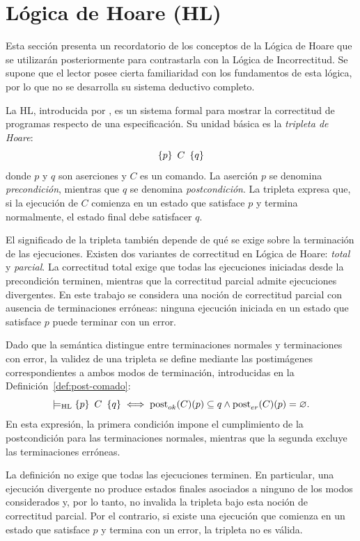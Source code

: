 \documentclass[a4paper,	11pt]{report}
\begin{document}
\section{Lógica de Hoare (HL)}
\label{sec:hoare}
Esta sección presenta un recordatorio de los conceptos de la Lógica de Hoare
que se utilizarán posteriormente para contrastarla con la Lógica de Incorrectitud.
Se supone que el lector posee cierta familiaridad con los fundamentos de esta lógica,
por lo que no se desarrolla su sistema deductivo completo.

La HL, introducida por \citet{hoare}, es un sistema formal para mostrar la correctitud de programas respecto de una especificación.
Su unidad básica es la \emph{tripleta de Hoare}:
$$\left\{ p \right\}~C~\left\{ q \right\}$$
donde $p$ y $q$ son aserciones y $C$ es un comando.
La aserción $p$ se denomina \emph{precondición}, mientras que $q$ se denomina \emph{postcondición}.
La tripleta expresa que, si la ejecución de $C$ comienza en un estado que satisface $p$ y termina normalmente,
el estado final debe satisfacer $q$.

El significado de la tripleta también depende de qué se exige sobre la terminación de las ejecuciones.
Existen dos variantes de correctitud en Lógica de Hoare: \emph{total} y \emph{parcial}.
La correctitud total exige que todas las ejecuciones iniciadas desde la precondición terminen,
mientras que la correctitud parcial admite ejecuciones divergentes.
En este trabajo se considera una noción de correctitud parcial con ausencia de terminaciones erróneas:
ninguna ejecución iniciada en un estado que satisface $p$ puede terminar con un error.

Dado que la semántica distingue entre terminaciones normales y terminaciones con error,
la validez de una tripleta se define mediante las postimágenes correspondientes a ambos modos de terminación,
introducidas en la Definición~\ref{def:post-comado}:
$$\models_{\mathrm{HL}} \left\{ p \right\}~C~\left\{ q \right\} \iff \operatorname{post}_{ok}(C)(p) \subseteq q \land \operatorname{post}_{er}(C)(p) = \varnothing.$$
En esta expresión,
la primera condición impone el cumplimiento de la postcondición para las terminaciones normales,
mientras que la segunda excluye las terminaciones erróneas.

La definición no exige que todas las ejecuciones terminen.
En particular,
una ejecución divergente no produce estados finales asociados a ninguno de los modos considerados y,
por lo tanto,
no invalida la tripleta bajo esta noción de correctitud parcial.
Por el contrario,
si existe una ejecución que comienza en un estado que satisface $p$ y termina con un error,
la tripleta no es válida.
\end{document}
